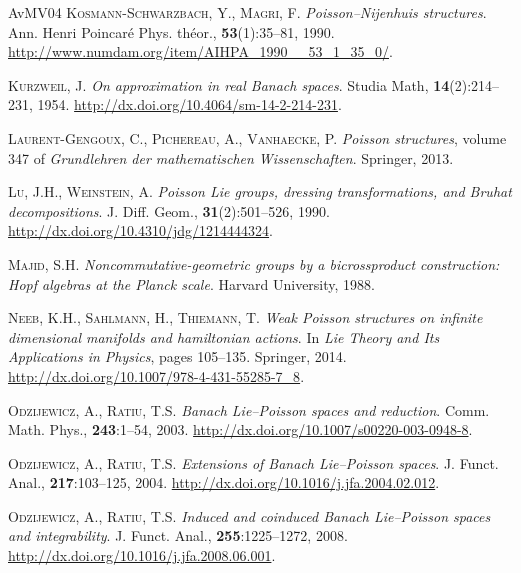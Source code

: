 \documentclass[a4paper,12pt,reqno]{amsart}%
\theoremstyle{definition}
\theoremstyle{remark}
\numberwithin{theorem}{section}
\numberwithin{equation}{section}
\newcommand{\1}{{\bf 1}}
\begin{document}
\begin{thebibliography}{AvMV04}
\textsc{Kosmann-Schwarzbach, Y.}, \textsc{Magri, F.}
\newblock \emph{Poisson--{N}ijenhuis structures}.
\newblock Ann. Henri Poincaré Phys. th{\'e}or., \textbf{53}(1):35--81, 1990.
\newblock \urlprefix\url{http://www.numdam.org/item/AIHPA_1990__53_1_35_0/}.

\textsc{Kurzweil, J.}
\newblock \emph{On approximation in real {B}anach spaces}.
\newblock Studia Math, \textbf{14}(2):214--231, 1954.
\newblock \urlprefix\url{http://dx.doi.org/10.4064/sm-14-2-214-231}.

\textsc{Laurent-Gengoux, C.}, \textsc{Pichereau, A.}, \textsc{Vanhaecke, P.}
\newblock \emph{Poisson structures}, volume 347 of \emph{Grundlehren der
  mathematischen Wissenschaften}.
\newblock Springer, 2013.

\textsc{Lu, J.H.}, \textsc{Weinstein, A.}
\newblock \emph{{P}oisson {L}ie groups, dressing transformations, and {B}ruhat
  decompositions}.
\newblock J. Diff. Geom., \textbf{31}(2):501--526, 1990.
\newblock \urlprefix\url{http://dx.doi.org/10.4310/jdg/1214444324}.

\textsc{Majid, S.H.}
\newblock \emph{Noncommutative-geometric groups by a bicrossproduct
  construction: {H}opf algebras at the {P}lanck scale}.
\newblock Harvard University, 1988.

\textsc{Neeb, K.H.}, \textsc{Sahlmann, H.}, \textsc{Thiemann, T.}
\newblock \emph{Weak {P}oisson structures on infinite dimensional manifolds and
  hamiltonian actions}.
\newblock In \emph{Lie Theory and Its Applications in Physics}, pages 105--135.
  Springer, 2014.
\newblock \urlprefix\url{http://dx.doi.org/10.1007/978-4-431-55285-7_8}.

\textsc{Odzijewicz, A.}, \textsc{Ratiu, T.S.}
\newblock \emph{Banach {L}ie--{P}oisson spaces and reduction}.
\newblock Comm. Math. Phys., \textbf{243}:1--54, 2003.
\newblock \urlprefix\url{http://dx.doi.org/10.1007/s00220-003-0948-8}.

\textsc{Odzijewicz, A.}, \textsc{Ratiu, T.S.}
\newblock \emph{Extensions of {B}anach {L}ie--{P}oisson spaces}.
\newblock J. Funct. Anal., \textbf{217}:103--125, 2004.
\newblock \urlprefix\url{http://dx.doi.org/10.1016/j.jfa.2004.02.012}.

\textsc{Odzijewicz, A.}, \textsc{Ratiu, T.S.}
\newblock \emph{Induced and coinduced {B}anach {L}ie--{P}oisson spaces and
  integrability}.
\newblock J. Funct. Anal., \textbf{255}:1225--1272, 2008.
\newblock \urlprefix\url{http://dx.doi.org/10.1016/j.jfa.2008.06.001}.


\end{thebibliography}
\end{document}

